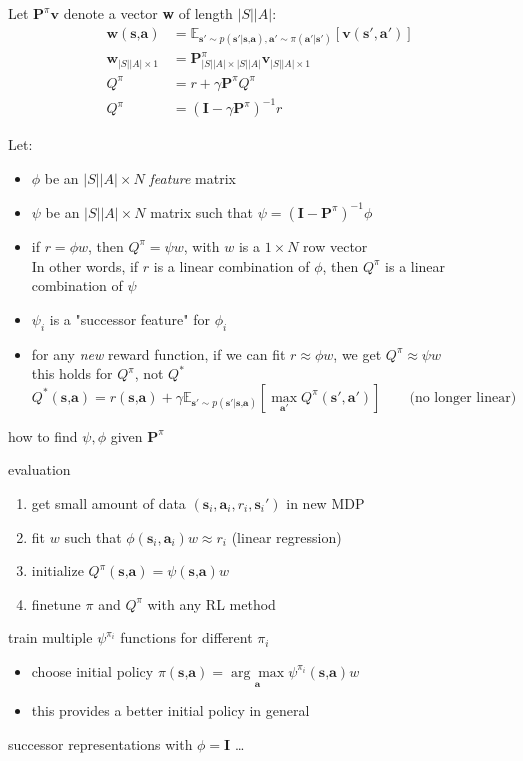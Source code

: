 Let $\textbf{P}^\pi \textbf{v}$ denote a vector \textbf{w} of length $|S||A|$:
\begin{align}
	\textbf{w}(\textbf{s,a}) &= \mathbb{E}_{\textbf{s}' \sim p(\textbf{s}'|\textbf{s,a}), \textbf{a}'\sim \pi(\textbf{a}'|\textbf{s}')} [\textbf{v}(\textbf{s}', \textbf{a}')]\\
	\textbf{w}_{|S||A|\times 1} &= \textbf{P}^\pi_{|S||A|\times|S||A|} \textbf{v}_{|S||A|\times 1}\\
	Q^\pi &= r + \gamma \textbf{P}^\pi Q^\pi\\
	Q^\pi &= (\textbf{I} - \gamma \textbf{P}^\pi)^{-1} r
\end{align}

Let:
\begin{itemize}
	\item $\phi$ be an $|S||A| \times N$ \textit{feature} matrix
	\item $\psi$ be an $|S||A| \times N$ matrix such that $\psi = (\textbf{I} - \textbf{P}^\pi)^{-1}\phi$
	\item if $r=\phi w$, then $Q^\pi = \psi w$, with $w$ is a $1 \times N$ row vector\\
	In other words, if $r$ is a linear combination of $\phi$, then $Q^\pi$ is a linear combination of $\psi$
	\item $\psi_i$ is a "successor feature" for $\phi_i$
	\item for any \textit{new} reward function, if we can fit $r \approx \phi w$, we get $Q^\pi \approx \psi w$\\
	\note this holds for $Q^\pi$, not $Q^*$
	\[ Q^*(\textbf{s,a}) = r(\textbf{s,a}) + \gamma \mathbb{E}_{\textbf{s}' \sim p(\textbf{s}'|\textbf{s,a})}\left[ \underset{\textbf{a}'}{\max} Q^\pi(\textbf{s}', \textbf{a}') \right] \qquad \text{(no longer linear)}\]
\end{itemize}

\todo{} how to find $\psi, \phi$ given $\textbf{P}^\pi$

 evaluation
\begin{enumerate}
	\item get small amount of data $(\textbf{s}_i, \textbf{a}_i, r_i, \textbf{s}_i')$ in new \ac{MDP}
	\item fit $w$ such that $\phi(\textbf{s}_i, \textbf{a}_i)w \approx r_i$ (linear regression)
	\item initialize $Q^\pi(\textbf{s,a}) = \psi(\textbf{s,a}) w$
	\item finetune $\pi$ and $Q^\pi$ with any \ac{RL} method
\end{enumerate}

 train multiple $\psi^{\pi_i}$ functions for different $\pi_i$
\begin{itemize}
	\item choose initial policy $\pi(\textbf{s,a}) = \underset{\textbf{a}}{\arg\max} \psi^{\pi_i}(\textbf{s,a}) w$
	\item this provides a better initial policy in general
\end{itemize}

 successor representations with $\phi = \textbf{I}$ \dots \cite{dayan1993improving}